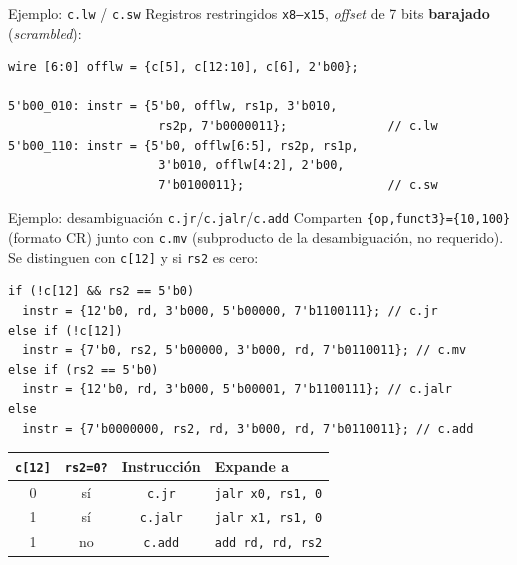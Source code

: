 \documentclass{beamer}
\begin{document}
\begin{frame}[fragile]{Ejemplo: \texttt{c.lw} / \texttt{c.sw}}
  Registros restringidos \texttt{x8--x15}, \textit{offset} de 7 bits
  \textbf{barajado} (\textit{scrambled}):
\begin{lstlisting}
wire [6:0] offlw = {c[5], c[12:10], c[6], 2'b00};

5'b00_010: instr = {5'b0, offlw, rs1p, 3'b010,
                     rs2p, 7'b0000011};              // c.lw
5'b00_110: instr = {5'b0, offlw[6:5], rs2p, rs1p,
                     3'b010, offlw[4:2], 2'b00,
                     7'b0100011};                    // c.sw
\end{lstlisting}
\end{frame}

\begin{frame}[fragile]{Ejemplo: desambiguación \texttt{c.jr}/\texttt{c.jalr}/\texttt{c.add}}
  Comparten \texttt{\{op,funct3\}=\{10,100\}} (formato CR) junto con
  \texttt{c.mv} (subproducto de la desambiguación, no requerido). Se
  distinguen con \texttt{c[12]} y si \texttt{rs2} es cero:
\begin{lstlisting}
if (!c[12] && rs2 == 5'b0)
  instr = {12'b0, rd, 3'b000, 5'b00000, 7'b1100111}; // c.jr
else if (!c[12])
  instr = {7'b0, rs2, 5'b00000, 3'b000, rd, 7'b0110011}; // c.mv
else if (rs2 == 5'b0)
  instr = {12'b0, rd, 3'b000, 5'b00001, 7'b1100111}; // c.jalr
else
  instr = {7'b0000000, rs2, rd, 3'b000, rd, 7'b0110011}; // c.add
\end{lstlisting}
  \begin{center}
  \small
  \begin{tabular}{@{}cccl@{}}
    \toprule
    \texttt{c[12]} & \texttt{rs2=0?} & \textbf{Instrucción} & \textbf{Expande a} \\
    \midrule
    0 & sí & \texttt{c.jr} & \texttt{jalr x0, rs1, 0} \\
    1 & sí & \texttt{c.jalr} & \texttt{jalr x1, rs1, 0} \\
    1 & no & \texttt{c.add} & \texttt{add rd, rd, rs2} \\
    \bottomrule
  \end{tabular}
  \end{center}
\end{frame}
\end{document}
